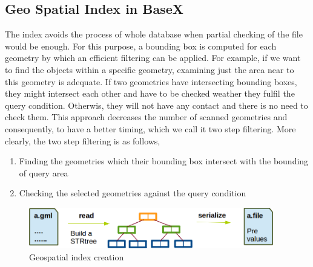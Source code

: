 \documentclass[a4paper,12pt]{article}
\begin{document}
\subsection{Geo Spatial Index in BaseX}
\label{indexBX}
The index avoids the process of whole database when partial checking  of the file would be enough.  For this purpose, a bounding box is computed for each  geometry by which an efficient  filtering can be applied. For example, if we want to find the objects within a specific geometry, examining just the area near to this geometry is adequate. If two geometries have intersecting bounding boxes, they might intersect each other and have to be checked weather they fulfil the query condition. Otherwis, they will not have any contact and there is no need to check them. This approach decreases the number of scanned geometries and consequently, to have a better timing, which we call it two step filtering. More clearly, the two step filtering is as follows,
\begin{enumerate}
\item Finding the geometries which their bounding box intersect with the bounding of query area
\item Checking the selected geometries against the query condition
\end{enumerate}


 \begin{figure}
\centering
\includegraphics[width=0.95\textwidth]{IndexinFile}
\caption{Geospatial index creation}
\label{figIndexinFile}
\end{figure}
\end{document}
